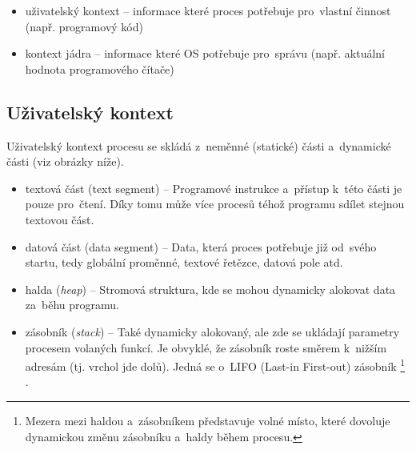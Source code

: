 \begin{itemize}[noitemsep]
	\item uživatelský kontext -- informace které proces potřebuje pro~vlastní činnost (např. programový kód)
	\item kontext jádra -- informace které OS potřebuje pro~správu (např. aktuální hodnota programového čítače)
\end{itemize}

\subsection{Uživatelský kontext}

Uživatelský kontext procesu se skládá z~neměnné (statické) části a~dynamické části (viz obrázky níže).

\begin{itemize}[noitemsep]
	\item textová část (text segment) -- Programové instrukce a~přístup k~této části je pouze pro~čtení. Díky tomu může více procesů téhož programu sdílet stejnou textovou část.
	\item datová část (data segment) -- Data, která proces potřebuje již od~svého startu, tedy globální proměnné, textové řetězce, datová pole atd.
	\item halda (\emph{heap}) -- Stromová struktura, kde se mohou dynamicky alokovat data za~běhu programu.
	\item zásobník (\emph{stack}) -- Také dynamicky alokovaný, ale zde se ukládají parametry procesem volaných funkcí. Je obvyklé, že zásobník roste směrem k~nižším adresám (tj. vrchol jde dolů). Jedná se o~LIFO (Last-in First-out) zásobník%
	\footnote{Mezera mezi haldou a~zásobníkem představuje volné místo, které dovoluje dynamickou změnu zásobníku a~haldy během procesu.}%
	.
\end{itemize}

